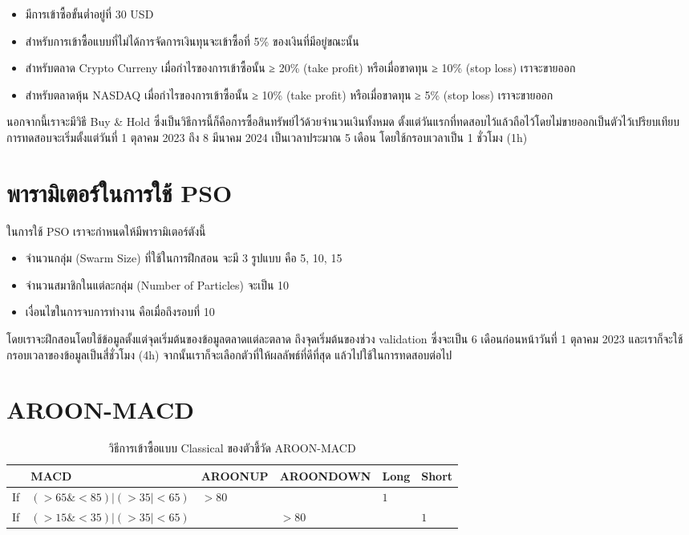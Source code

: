 \begin{itemize}
    \item {มีการเข้าซื้อขั้นต่ำอยู่ที่ 30 USD}
    \item {สำหรับการเข้าซื้อแบบที่ไม่ได้การจัดการเงินทุนจะเข้าซื้อที่ 5\% ของเงินที่มีอยู่ขณะนั้น}
    \item {สำหรับตลาด Crypto Curreny เมื่อกำไรของการเข้าซื้อนั้น ≥ 20\% (take profit) หรือเมื่อขาดทุน ≥ 10\% (stop loss) เราจะขายออก}
    \item {สำหรับตลาดหุ้น NASDAQ เมื่อกำไรของการเข้าซื้อนั้น ≥ 10\% (take profit) หรือเมื่อขาดทุน ≥ 5\% (stop loss) เราจะขายออก}
\end{itemize}
นอกจากนี้เราจะมีวิธี Buy \& Hold ซึ่งเป็นวิธีการนี้ก็คือการซื้อสินทรัพย์ไว้ด้วยจำนวนเงินทั้งหมด ตั้งแต่วันแรกที่ทดสอบไว้แล้วถือไว้โดยไม่ขายออกเป็นตัวไว้เปรียบเทียบ การทดสอบจะเริ่มตั้งแต่วันที่ 1 ตุลาคม 2023 ถึง 8 มีนาคม 2024 เป็นเวลาประมาณ 5 เดือน โดยใช้กรอบเวลาเป็น 1 ชั่วโมง (1h)

\section{พารามิเตอร์ในการใช้ PSO}
ในการใช้ PSO เราจะกำหนดให้มีพารามิเตอร์ตังนี้
\begin{itemize}
    \item {จำนวนกลุ่ม (Swarm Size) ที่ใช้ในการฝึกสอน จะมี 3 รูปแบบ คือ 5, 10, 15}
    \item {จำนวนสมาชิกในแต่ละกลุ่ม (Number of Particles) จะเป็น 10}
    \item {เงื่อนไขในการจบการทำงาน คือเมื่อถึงรอบที่ 10}
\end{itemize}
โดยเราจะฝึกสอนโดยใช้ข้อมูลตั้งแต่จุดเริ่มต้นของข้อมูลตลาดแต่ละตลาด ถึงจุดเริ่มต้นของช่วง validation ซึ่งจะเป็น 6 เดือนก่อนหน้าวันที่ 1 ตุลาคม 2023 และเราก็จะใช้กรอบเวลาของข้อมูลเป็นสี่ชั่วโมง (4h) จากนั้นเราก็จะเลือกตัวที่ให้ผลลัพธ์ที่ดีที่สุด แล้วไปใช้ในการทดสอบต่อไป

\section{AROON-MACD}
\begin{table}[ht]
    \centering
    \begin{tabular}{llllll}
        \hline
           & MACD                          & AROONUP & AROONDOWN & Long & Short \\ \hline
        If & $(>65 \& <85) | (>35 | < 65)$ & $>80$   &           & $1$  &       \\ \hline
        If & $(>15 \& <35) | (>35 | < 65)$ &         & $>80$     &      & $1$   \\ \hline
    \end{tabular}
    \caption{วิธีการเข้าซื้อแบบ Classical ของตัวชี้วัด AROON-MACD}
\end{table}

